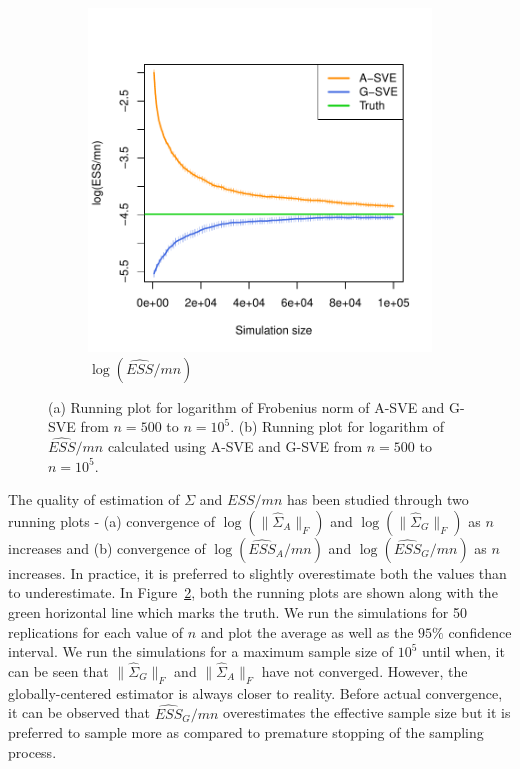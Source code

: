 \documentclass[11pt]{article}
\theoremstyle{remark}
\begin{document}
\begin{figure}[htbp]
\begin{subfigure}{0.4\textwidth}
      \includegraphics[width = \textwidth]{plots/var-ess.pdf}
      \caption{$\log(\hat{ESS}/mn)$}
      \label{subfig:var-frob}
    \end{subfigure}
    \caption{(a) Running plot for logarithm of Frobenius norm of A-SVE and G-SVE from $n = 500$ to $n = 10^5$. (b) Running plot for logarithm of $\hat{ESS}/mn$ calculated using A-SVE and G-SVE from $n=500$ to $n=10^5$.}
    \label{fig:var-frob_n_ess}
\end{figure}

The quality of estimation of $\Sigma$ and $ESS/mn$ has been studied through two running plots - (a) convergence of $\log(\|\hat{\Sigma}_A\|_F)$ and $\log(\|\hat{\Sigma}_G\|_F)$ as $n$ increases and (b) convergence of $\log(\hat{ESS}_A/mn)$ and $\log(\hat{ESS}_G/mn)$ as $n$ increases. In practice, it is preferred to slightly overestimate both the values than to underestimate. In Figure~\ref{fig:var-frob_n_ess}, both the running plots are shown along with the green horizontal line which marks the truth. We run the simulations for 50 replications for each value of $n$ and plot the average as well as the $95\%$ confidence interval. We run the simulations for a maximum sample size of $10^5$ until when, it can be seen that $\|\hat{\Sigma}_G\|_F$ and $\|\hat{\Sigma}_A\|_F$ have not converged. However, the globally-centered estimator is always closer to reality. Before actual convergence, it can be observed that $\hat{ESS}_G/mn$ overestimates the effective sample size but it is preferred to sample more as compared to premature stopping of the sampling process.\\
\end{document}
